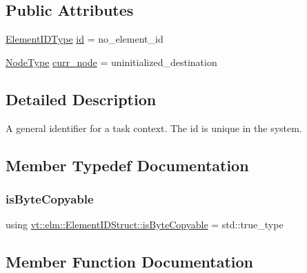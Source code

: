 \subsection*{Public Attributes}
\begin{DoxyCompactItemize}
\item 
\hyperlink{namespacevt_1_1elm_a63afb64985b41b7b6dcf2f01336391f8}{Element\+I\+D\+Type} \hyperlink{structvt_1_1elm_1_1_element_i_d_struct_aa4dc0aed0581098508f2d2b3f8475d10}{id} = no\+\_\+element\+\_\+id
\item 
\hyperlink{namespacevt_a866da9d0efc19c0a1ce79e9e492f47e2}{Node\+Type} \hyperlink{structvt_1_1elm_1_1_element_i_d_struct_af0916244e9dbfe1c746e68b5fb1b5421}{curr\+\_\+node} = uninitialized\+\_\+destination
\end{DoxyCompactItemize}


\subsection{Detailed Description}
A general identifier for a task context. The {\ttfamily id} is unique in the system. 

\subsection{Member Typedef Documentation}
\mbox{\label{structvt_1_1elm_1_1_element_i_d_struct_a1d5b611a29416aee3eb588a723851f8b}} 
\subsubsection{\texorpdfstring{is\+Byte\+Copyable}{isByteCopyable}}
{\footnotesize\ttfamily using \hyperlink{structvt_1_1elm_1_1_element_i_d_struct_a1d5b611a29416aee3eb588a723851f8b}{vt\+::elm\+::\+Element\+I\+D\+Struct\+::is\+Byte\+Copyable} =  std\+::true\+\_\+type}



\subsection{Member Function Documentation}
\mbox{\label{structvt_1_1elm_1_1_element_i_d_struct_afa66d3704b485043da7ba93f05d04737}} 
